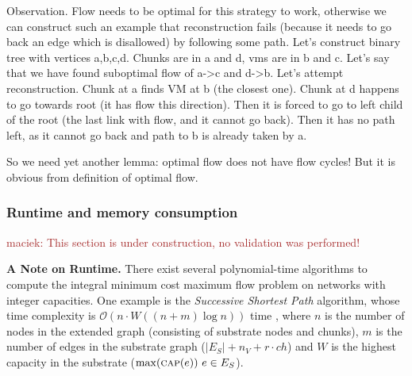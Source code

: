 \documentclass[9pt,twocolumn]{scrartcl}
\newcommand{\Capacity}{\ensuremath{\textsc{cap}}}
\newcommand{\maciek}[1]{\textcolor{brown}{maciek: #1}}
\newcommand{\RedundancyFactor}{\ensuremath{r}}
\newcommand{\SubstrateEdges}{\ensuremath{E_S}}
\newcommand{\SubstrateEdge}{\ensuremath{e}}
\newcommand{\Vms}{\ensuremath{n_V}}
\newcommand{\ChunkTypes}{\ensuremath{ch}}
\begin{document}
Observation. Flow needs to be optimal for this strategy to work, otherwise we can construct such an example that reconstruction fails (because it needs to go back an edge which is disallowed) by following some path. Let's construct binary tree with vertices a,b,c,d. Chunks are in a and d, vms are in b and c. Let's say that we have found suboptimal flow of a->c and d->b. Let's attempt reconstruction. Chunk at a finds VM at b (the closest one). Chunk at d happens to go towards root (it has flow this direction). Then it is forced to go to left child of the root (the last link with flow, and it cannot go back). Then it has no path left, as it cannot go back and path to b is already taken by a.

So we need yet another lemma: optimal flow does not have flow cycles! But it is obvious from definition of optimal flow.



\subsubsection{Runtime and memory consumption}

\maciek{This section is under construction, no validation was performed!}

\textbf{A Note on Runtime.} There exist several polynomial-time algorithms to compute
the integral minimum cost maximum flow problem on networks with integer capacities.
One example is the \emph{Successive Shortest Path} algorithm,
whose time complexity is $\mathcal{O}(n \cdot W((n+m)\log n)
)$ time \cite{successive_shortest_path_complexity}, where $n$ is the number of
nodes in the extended graph (consisting of substrate nodes and chunks),
$m$ is the number of edges in the substrate graph ($|\SubstrateEdges| + \Vms + \RedundancyFactor
\cdot \ChunkTypes$) and $W$ is the highest capacity in the substrate
($\max(\Capacity(\SubstrateEdge))~\SubstrateEdge\in\SubstrateEdges$).
\end{document}
